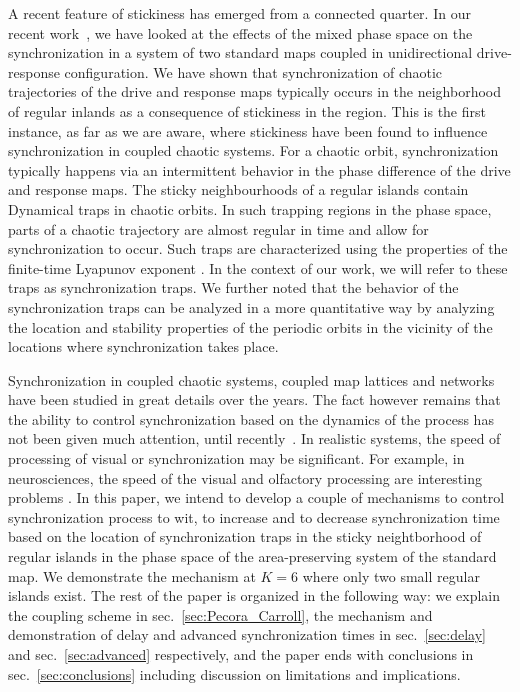 \documentclass[preprint,showpacs,preprintnumbers,amsmath,amssymb]{revtex4-1}
\begin{document}
A recent feature of stickiness has emerged from a connected quarter. In our recent work~\cite{Mahata2016}, we have looked at the effects of the mixed phase space on the synchronization in a system of two standard maps coupled in unidirectional drive-response configuration. We have shown that synchronization of chaotic trajectories of the drive and response maps typically occurs in the neighborhood of regular inlands as a consequence of stickiness in the region.  This is the first instance, as far as we are aware, where stickiness have been found to influence synchronization in coupled chaotic systems.  For a chaotic orbit, synchronization typically happens via an intermittent behavior in the phase difference of the drive and response maps.   The sticky neighbourhoods of a regular islands contain Dynamical traps in chaotic orbits. In such trapping regions in the phase space, parts of a chaotic trajectory are almost regular in time and allow for synchronization to occur. Such traps are characterized using the properties of the finite-time Lyapunov exponent \cite{Szezech2005}. In the context of our work, we will refer to these traps as synchronization traps. We further noted that the behavior of the synchronization traps can be analyzed in a more quantitative way by analyzing the location and stability properties of the periodic orbits in the vicinity of the locations where synchronization takes place. 

Synchronization in coupled chaotic systems, coupled map lattices and networks 
have been studied in great details over the years. The fact however remains 
that the ability to control synchronization based on the dynamics of the 
process has not been given much attention, until 
recently~\cite{Grabow2011,Wang2016}. In realistic systems, the speed of 
processing of visual or  synchronization may be significant. For example, in 
neurosciences,  the speed of the visual and olfactory processing are 
interesting problems \cite{Thorpe1996,Uchida2003}. In this paper, we intend 
to develop a couple of 
mechanisms to control synchronization process to wit,  to increase and to 
decrease synchronization time based on the location of synchronization traps 
in the sticky neightborhood of regular islands in the phase space of the 
area-preserving system of the standard map. We demonstrate the mechanism at $K 
= 6$ where only two small regular islands exist.  The rest of the paper is 
organized in the following way: we explain the coupling scheme in 
sec.~\ref{sec:Pecora_Carroll}, the mechanism and demonstration of delay and 
advanced synchronization times in sec.~\ref{sec:delay} and 
sec.~\ref{sec:advanced} respectively, and the paper ends with conclusions in 
sec.~\ref{sec:conclusions} including discussion on limitations and 
implications. 
\end{document}
